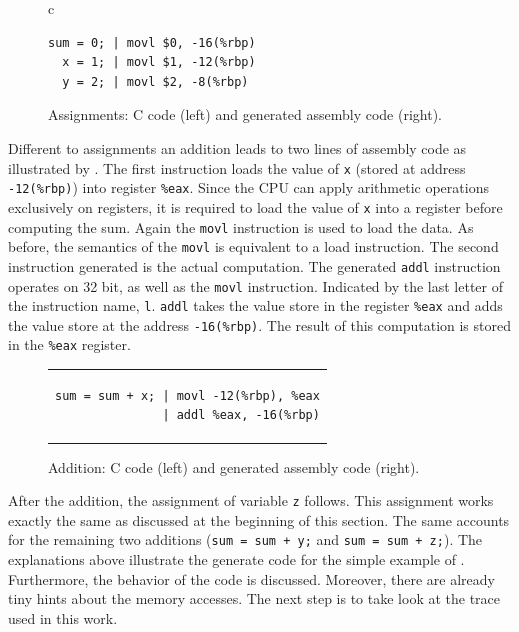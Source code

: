 \documentclass[onecolumn, openright, master, english, signatures]{dbrgrptt}
\begin{document}
\begin{figure}[!ht]
  \centering
  \begin{tabular}{c}
  \begin{lstlisting}
sum = 0; | movl $0, -16(%rbp)
  x = 1; | movl $1, -12(%rbp)
  y = 2; | movl $2, -8(%rbp)
  \end{lstlisting}
  \end{tabular}
  \caption{Assignments: C code (left) and generated assembly code (right).}
  \label{fig:mat-example-comp-assignment}
\end{figure}

Different to assignments an addition leads to two lines of assembly code as illustrated by .
The first instruction loads the value of \texttt{x} (stored at address \texttt{-12(\%rbp)}) into register \texttt{\%eax}.
Since the \ac{CPU} can apply arithmetic operations exclusively on registers, it is required to load the value of \texttt{x} into a register before computing the sum.
Again the \texttt{movl} instruction is used to load the data.
As before, the semantics of the \texttt{movl} is equivalent to a load instruction.
The second instruction generated is the actual computation.
The generated \texttt{addl} instruction operates on 32 bit, as well as the \texttt{movl} instruction.
Indicated by the last letter of the instruction name, \texttt{l}.
\texttt{addl} takes the value store in the register \texttt{\%eax} and adds the value store at the address \texttt{-16(\%rbp)}.
The result of this computation is stored in the \texttt{\%eax} register.

\begin{figure}[!ht]
  \centering
  \begin{tabular}{c}
  \begin{lstlisting}
sum = sum + x; | movl -12(%rbp), %eax
               | addl %eax, -16(%rbp)
  \end{lstlisting}
  \end{tabular}
  \caption{Addition: C code (left) and generated assembly code (right).}
  \label{fig:mat-example-comp-addition}
\end{figure}

After the addition, the assignment of variable \texttt{z} follows.
This assignment works exactly the same as discussed at the beginning of this section.
The same accounts for the remaining two additions (\texttt{sum = sum + y;} and \texttt{sum = sum + z;}).
The explanations above illustrate the generate code for the simple example of .
Furthermore, the behavior of the code is discussed.
Moreover, there are already tiny hints about the memory accesses.
The next step is to take look at the \ac{trace} used in this work.
\end{document}
